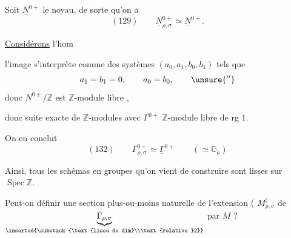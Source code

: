 Soit $\underline N^{0+}$ le noyau, de sorte qu'on a
\[
(129)\qquad\underline N_{\rho,\sigma}^{0+}\simeq\underline N^{0+}.
\]

\uline{Considérons} l'hom

l'image  s'interprète comme  des systèmes $(a_0,a_1,b_0,b_1)$ tels que 
\[
a_1=b_1=0,\qquad a_0=b_0,\qquad\unsure{''}
\]
donc  $N^{0+}/\mathbb Z$ est  $\mathbb Z$-module libre ,

donc  suite exacte de $\mathbb Z$-modules
avec $\Gamma^{0+}$ $\mathbb Z$-module libre de rg $1$.

On en conclut
\[
(132)\qquad\Gamma_{\rho,\sigma}^{0+}\simeq\underline\Gamma^{0+}
\qquad(\simeq\mathbb G_a)
\]

 Ainsi, tous les schémas en groupes qu'on vient de construire sont lisses sur $\operatorname{Spec}\mathbb Z$.

Peut-on définir une section plus-ou-moins naturelle de l'extension
(
$M_{\rho,\sigma}^{\sharp}$ de
$\underbrace{\Gamma_{\rho,\sigma}}_{\inserted{\substack{\text{lisse de dim}\\\text{relative }2}}}$
par $\underline M$ ?

